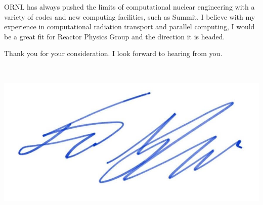 \documentclass[11pt,letterpaper,roman]{moderncv}        %
\makeatletter
\renewcommand*{\makeletterclosing}{
	\@closing\\[0em]%
	{\includegraphics[scale=0.1]{signature_ghaddar.jpg}
		\par
		\bfseries \@firstname~\@lastname}%
		\\
	\ifthenelse{\isundefined{\@enclosure}}{}{%
		\vfill%
		{\color{color2}\itshape\enclname: \@enclosure}}}
\makeatother
\begin{document}
ORNL has always pushed the limits of computational nuclear engineering with a variety of codes and new computing facilities, such as Summit. I believe with my experience in computational radiation transport and parallel computing, I would be a great fit for Reactor Physics Group and the direction it is headed. 


Thank you for your consideration. I look forward to hearing from you.

\makeletterclosing
\end{document}
